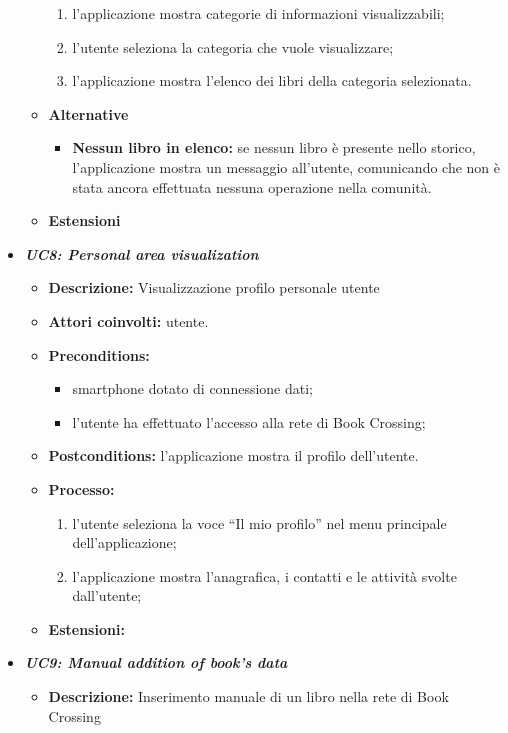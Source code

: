 \begin{itemize}
\begin{itemize}
\begin{enumerate}
			\item l’applicazione mostra categorie di informazioni visualizzabili;
			\item l’utente seleziona la categoria che vuole visualizzare;
			\item l'applicazione mostra l'elenco dei libri della categoria selezionata.
		\end{enumerate}
		\item \textbf{Alternative}
		\begin{itemize}
			\item \textbf{Nessun libro in elenco:} se nessun libro è presente nello storico, l'applicazione mostra un messaggio all'utente, comunicando che non è stata ancora effettuata nessuna operazione nella comunità.
		\end{itemize}
		\item \textbf{Estensioni}
	\end{itemize}
	\item \textbf{\textit{UC8: Personal area visualization}}
	\begin{itemize}
		\item \textbf{Descrizione: } Visualizzazione profilo personale utente
		\item \textbf{Attori coinvolti:} utente.
		\item \textbf{Preconditions:}
		\begin{itemize}
			\item smartphone dotato di connessione dati;
			\item l’utente ha effettuato l’accesso alla rete di Book Crossing;
		\end{itemize}
		\item \textbf{Postconditions: }l’applicazione mostra il profilo dell’utente.
		\item \textbf{Processo: }
		\begin{enumerate}
			\item l’utente seleziona la voce “Il mio profilo” nel menu principale dell’applicazione;
			\item l’applicazione mostra l’anagrafica, i contatti e le attività svolte dall’utente;
		\end{enumerate}
		\item \textbf{Estensioni:}
	\end{itemize}
	\item \textbf{\textit{UC9: Manual addition of book's data}} \label{itemize:UC9}
	\begin{itemize}
		\item \textbf{Descrizione:} Inserimento manuale di un libro nella rete di Book Crossing

\end{itemize}
\end{itemize}
